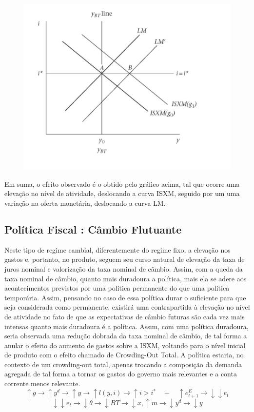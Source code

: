 \documentclass[a4paper,12pt]{article}[abntex2]
\begin{document}
\begin{figure}[H]
    \centering
    \includegraphics[width=0.7\linewidth]{Imagens/a23i6.png}
\end{figure}

Em suma, o efeito observado é o obtido pelo gráfico acima, tal que ocorre uma elevação no nível de atividade, deslocando a curva ISXM, seguido por um uma variação na oferta monetária, deslocando a curva LM. 

\subsection{\textbf{Política Fiscal : Câmbio Flutuante}}

Neste tipo de regime cambial, diferentemente do regime fixo, a elevação nos gastos e, portanto, no produto, seguem seu curso natural de elevação da taxa de juros nominal e valorização da taxa nominal de câmbio. Assim, com a queda da taxa nominal de câmbio, quanto mais duradoura a política, mais ela se adere aos acontecimentos previstos por uma política permanente do que uma política temporária. Assim, pensando no caso de essa política durar o suficiente para que seja considerada como permanente, existirá uma contrapartida à elevação no nível de atividade no fato de que as expectativas de câmbio futuras são cada vez mais intensas quanto mais duradoura é a política. Assim, com uma política duradoura, seria observada uma redução dobrada da taxa nominal de câmbio, de tal forma a anular o efeito do aumento de gastos sobre a ISXM, voltando para o nível inicial de produto com o efeito chamado de Crowding-Out Total. A política estaria, no contexto de um crowding-out total, apenas trocando a composição da demanda agregada de tal forma a tornar os gastos do governo mais relevantes e a conta corrente menos relevante. 
\[
\uparrow g \rightarrow \uparrow y^d \rightarrow \uparrow y \rightarrow \uparrow l(y, i) \rightarrow \uparrow i > i^* \quad + \quad \uparrow e_{t+1}^E \rightarrow \downarrow\downarrow e_t
\]
\[
\downarrow\downarrow e_t \rightarrow \downarrow \theta \rightarrow \downarrow BT \rightarrow \downarrow x, \uparrow m \rightarrow \downarrow y^d \rightarrow \downarrow y
\]
\end{document}
